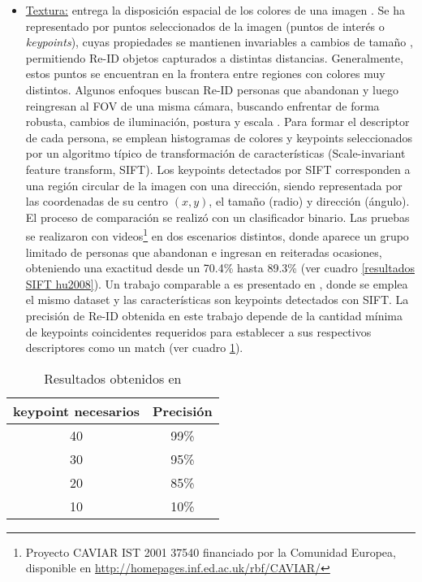 \documentclass[../memoria.tex]{subfiles}
\begin{document}
\begin{itemize}
\begin{itemize}
			\item \underline{Textura:} entrega la disposición espacial de los colores de una imagen \cite{stockman2001computervision}. Se ha representado por puntos seleccionados de la imagen (puntos de interés o \emph{keypoints}), cuyas propiedades se mantienen invariables a cambios de tamaño \cite{lowe1999object, bay2006surf}, permitiendo Re-ID objetos capturados a distintas distancias. Generalmente, estos puntos se encuentran en la frontera entre regiones con colores muy distintos. Algunos enfoques buscan Re-ID personas que abandonan y luego reingresan al FOV de una misma cámara, buscando enfrentar de forma robusta, cambios de iluminación, postura y escala \cite{hu2008people}. Para formar el descriptor de cada persona, se emplean histogramas de colores y keypoints seleccionados por un algoritmo típico de transformación de características \cite{lowe1999object} (Scale-invariant feature transform, SIFT). Los keypoints detectados por SIFT corresponden a una región circular de la imagen con una dirección, siendo representada por las coordenadas de su centro $(x,y)$, el tamaño (radio) y dirección (ángulo). El proceso de comparación se realizó con un clasificador binario. Las pruebas se realizaron con videos\footnote{Proyecto CAVIAR IST 2001 37540 financiado por la Comunidad Europea, disponible en \url{http://homepages.inf.ed.ac.uk/rbf/CAVIAR/}} en dos escenarios distintos, donde aparece un grupo limitado de personas que abandonan e ingresan en reiteradas ocasiones, obteniendo una exactitud desde un 70.4\% hasta 89.3\% (ver cuadro \ref{resultados SIFT hu2008}). Un trabajo comparable a \cite{hu2008people} es presentado en \cite{hamdoun2008person}, donde se emplea el mismo dataset y las características son keypoints detectados con SIFT. La precisión de Re-ID obtenida en este trabajo depende de la cantidad mínima de keypoints coincidentes requeridos para establecer a sus respectivos descriptores como un match (ver cuadro \ref{resultados SIFT hamdoun2008person}).

		\end{itemize}
	
	\begin{table}
	  \begin{center}
	    \begin{tabular}{cc}
	      \hline
	      keypoint necesarios & Precisión \\
	      \hline
	      40 & 99\% \\
	      30 & 95\% \\
	      20 & 85\% \\
	      10 & 10\% \\
	      \hline
	    \end{tabular}  
	  \end{center}
	  \caption{Resultados obtenidos en  \cite{hamdoun2008person}}
	\label{resultados SIFT hamdoun2008person}
	\end{table}


\end{itemize}
\end{document}
